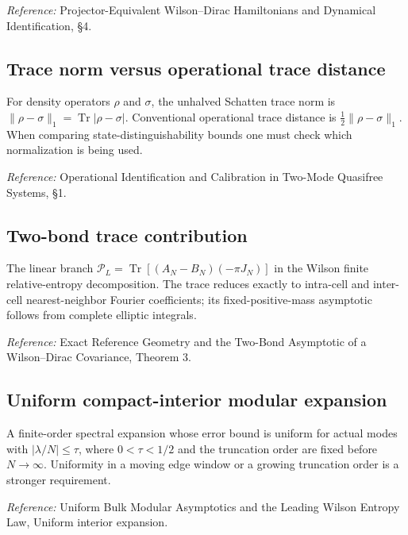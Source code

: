\documentclass[
  10pt,
  a4paper,
]{article}
\begin{document}
\nopagebreak[4]

\emph{Reference:} Projector-Equivalent Wilson--Dirac Hamiltonians and Dynamical Identification, §4.

\subsection{Trace norm versus operational trace distance}\label{trace-norm-versus-operational-trace-distance}

For density operators \(\rho\) and \(\sigma\), the unhalved Schatten trace norm is \(\|\rho-\sigma\|_1=\operatorname{Tr}|\rho-\sigma|\). Conventional operational trace distance is \(\frac12\|\rho-\sigma\|_1\). When comparing state-distinguishability bounds one must check which normalization is being used.

\nopagebreak[4]

\emph{Reference:} Operational Identification and Calibration in Two-Mode Quasifree Systems, §1.

\subsection{Two-bond trace contribution}\label{two-bond-trace-contribution}

The linear branch \(\mathcal P_L=\operatorname{Tr}[(A_N-B_N)(-\pi J_N)]\) in the Wilson finite relative-entropy decomposition. The trace reduces exactly to intra-cell and inter-cell nearest-neighbor Fourier coefficients; its fixed-positive-mass asymptotic follows from complete elliptic integrals.

\nopagebreak[4]

\emph{Reference:} Exact Reference Geometry and the Two-Bond Asymptotic of a Wilson--Dirac Covariance, Theorem 3.

\subsection{Uniform compact-interior modular expansion}\label{uniform-compact-interior-modular-expansion}

A finite-order spectral expansion whose error bound is uniform for actual modes with \(|\lambda/N|\le\tau\), where \(0<\tau<1/2\) and the truncation order are fixed before \(N\to\infty\). Uniformity in a moving edge window or a growing truncation order is a stronger requirement.

\nopagebreak[4]

\emph{Reference:} Uniform Bulk Modular Asymptotics and the Leading Wilson Entropy Law, Uniform interior expansion.
\end{document}
